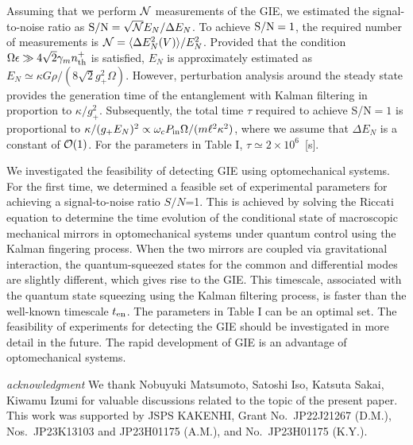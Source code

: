 \documentclass[twocolumn,superscriptaddress,aps,preprintnumbers,amsmath,amssymb,prl,nofootinbib]{revtex4}
\begin{document}
Assuming that we perform ${\cal N}$ measurements of the GIE, 
we estimated the signal-to-noise ratio as 
$    {\rm S/ N}={\sqrt{\cal N}E_N/ \Delta E_N}$. 
To achieve ${\rm S/N}=1$, the required number of measurements is
$    {\cal N}={\langle\Delta E_N^2(V)\rangle/ E_N^2 }$. 
Provided that the condition $\Omega\epsilon\gg4\sqrt{2}\gamma_mn^+_{\rm th}$ is satisfied, $E_N$ is approximately estimated as $E_N\simeq \kappa G\rho/(8\sqrt{2}g_+^2\Omega)$. 
However, perturbation analysis around the steady state
provides the generation time of the entanglement
with Kalman filtering in proportion to 
$\kappa/g_+^2$.
Subsequently, the total time $\tau$ required to achieve S/N$=1$
is proportional to $\kappa/(g_+E_N)^2 %
\propto\omega_cP_{\rm in}\Omega/(m\ell^2\kappa^2)$, where we assume that $\Delta E_N
$ is a constant of ${\cal O}(1)$.
For the parameters in Table I, $\tau\simeq 2\times 10^6$~[s].


We investigated the feasibility of detecting GIE using optomechanical systems. 
For the first time, we determined a feasible set of experimental parameters for achieving a signal-to-noise ratio $S/N$=1.
This is achieved by solving the Riccati equation to determine the time evolution of the conditional state of macroscopic mechanical mirrors in optomechanical systems under quantum control using the Kalman fingering process.
When the two mirrors are coupled via gravitational interaction, the quantum-squeezed states for the common and differential modes are slightly different, which gives rise to the GIE. 
This timescale, associated with
the quantum state squeezing using the Kalman filtering process, is faster than the well-known timescale $t_{\rm en}$.
The parameters in Table I can be an optimal set.  
The feasibility of experiments for detecting the GIE should be investigated in more detail in the future.
The rapid development of GIE is an advantage of optomechanical systems.






{\it acknowledgment }
We thank Nobuyuki Matsumoto, Satoshi Iso, Katsuta Sakai, Kiwamu Izumi for valuable discussions related to the topic of the present paper.
This work was supported by JSPS KAKENHI, Grant No.~JP22J21267 (D.M.),  Nos.~JP23K13103 and JP23H01175 
(A.M.), and No.~JP23H01175 (K.Y.).
\end{document}

